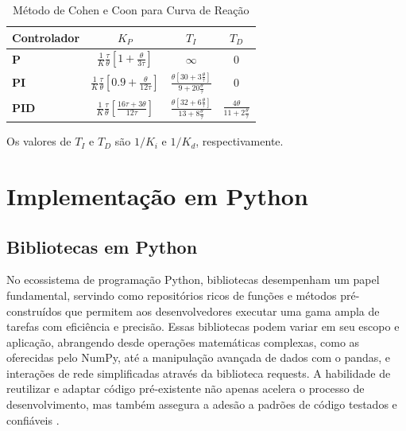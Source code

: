 \begin{table}[h]
    \begin{center}
        \begin{tabular}{ | l | c | c | c | }
            \hline
            {\textbf{Controlador}} & {$K_P$}                               & {$T_I$}                & {$T_D$}       \\
            \hline
            {\textbf{P}}           & {$\frac{1}{K}\frac{\tau}{\theta}[1+\frac{\theta}{3\tau}]$}    & {$\infty$}             & {$0$}         \\
            \hline
            {\textbf{PI}}          & {$\frac{1}{K}\frac{\tau}{\theta}[0.9+\frac{\theta}{12\tau}]$} & {$\frac{\theta [30+3 \frac{\theta}{\tau}]}{9+20 \frac{\theta}{\tau}}$} & {$0$}         \\
            \hline
            {\textbf{PID}}         & {$\frac{1}{K}\frac{\tau}{\theta}[\frac{16\tau+3\theta}{12\tau}]$} & {$\frac{\theta [32+6 \frac{\theta}{\tau}]}{13+8 \frac{\theta}{\tau}}$}            & {$\frac{4 \theta}{11+2 \frac{\theta}{\tau}}$} \\
            \hline
        \end{tabular}
        \caption{Método de Cohen e Coon para Curva de Reação}
        \label{tab:cccntb}
    \end{center}
\end{table}

Os valores de $T_I$ e $T_D$ são $1/K_i$ e $1/K_d$, respectivamente.

\section{Implementação em {Python}}

\subsection{Bibliotecas em {Python}}


No ecossistema de programação {Python}, bibliotecas desempenham um papel fundamental, servindo como repositórios ricos de
funções e métodos pré-construídos que permitem aos desenvolvedores executar uma gama ampla de tarefas com eficiência e
precisão.
Essas bibliotecas podem variar em seu escopo e aplicação, abrangendo desde operações matemáticas complexas, como as
oferecidas pelo NumPy, até a manipulação avançada de dados com o pandas, e interações de rede simplificadas através da
biblioteca requests.
A habilidade de reutilizar e adaptar código pré-existente não apenas acelera o processo de desenvolvimento, mas também
assegura a adesão a padrões de código testados e confiáveis \cite{pipy,pydocs} .

